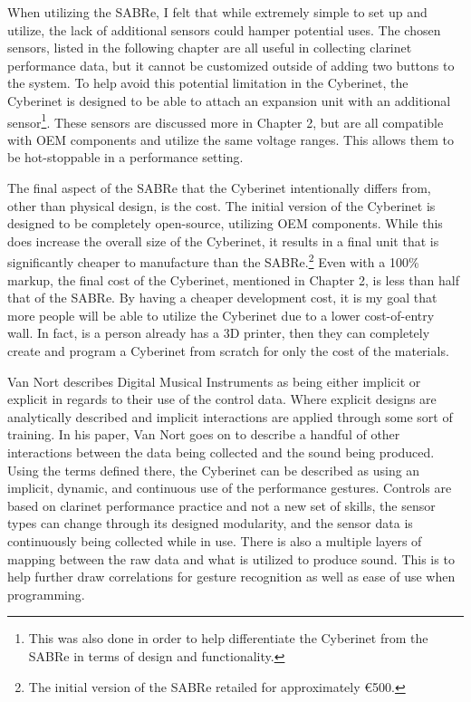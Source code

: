 When utilizing the SABRe, I felt that while extremely simple to set up and utilize, the lack of additional sensors could hamper potential uses. The chosen sensors, listed in the following chapter are all useful in collecting clarinet performance data, but it cannot be customized outside of adding two buttons to the system. To help avoid this potential limitation in the Cyberinet, the Cyberinet is designed to be able to attach an expansion unit with an additional sensor\footnote{This was also done in order to help differentiate the Cyberinet from the SABRe in terms of design and functionality.}. These sensors are discussed more in Chapter 2, but are all compatible with OEM components and utilize the same voltage ranges. This allows them to be hot-stoppable in a performance setting.

The final aspect of the SABRe that the Cyberinet intentionally differs from, other than physical design, is the cost. The initial version of the Cyberinet is designed to be completely open-source, utilizing OEM components. While this does increase the overall size of the Cyberinet, it results in a final unit that is significantly cheaper to manufacture than the SABRe.\footnote{The initial version of the SABRe retailed for approximately €500.} Even with a 100\% markup, the final cost of the Cyberinet, mentioned in Chapter 2, is less than half that of the SABRe. By having a cheaper development cost, it is my goal that more people will be able to utilize the Cyberinet due to a lower cost-of-entry wall. In fact, is a person already has a 3D printer, then they can completely create and program a Cyberinet from scratch for only the cost of the materials.


Van Nort describes Digital Musical Instruments as being either implicit or explicit in regards to their use of the control data. Where explicit designs are analytically described and implicit interactions are applied through some sort of training\cite{vanNortMapping2007}. In his paper, Van Nort goes on to describe a handful of other interactions between the data being collected and the sound being produced. Using the terms defined there, the Cyberinet can be described as using an implicit, dynamic, and continuous use of the performance gestures. Controls are based on clarinet performance practice and not a new set of skills, the sensor types can change through its designed modularity, and the sensor data is continuously being collected while in use. There is also a multiple layers of mapping between the raw data and what is utilized to produce sound. This is to help further draw correlations for gesture recognition as well as ease of use when programming.

